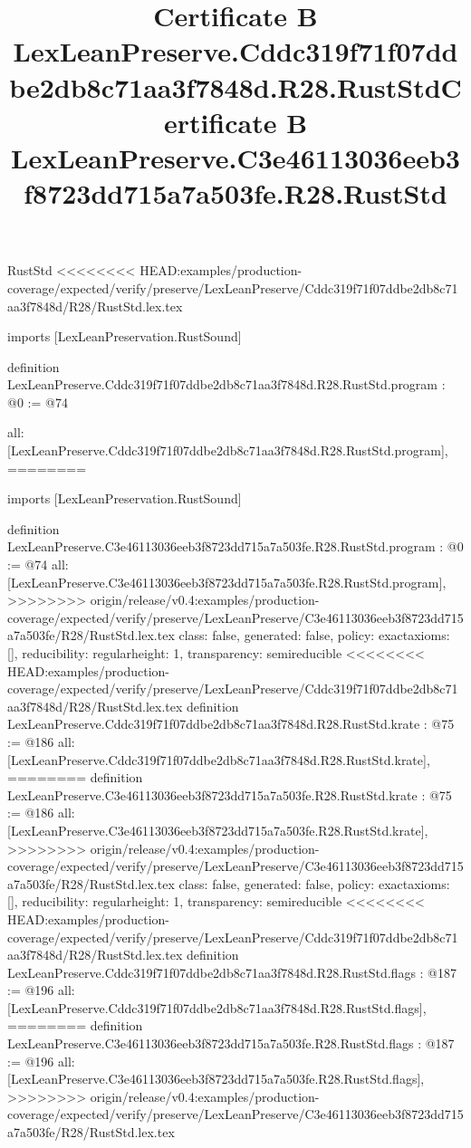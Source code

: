 \begin{lexlean}{RustStd}
<<<<<<<< HEAD:examples/production-coverage/expected/verify/preserve/LexLeanPreserve/Cddc319f71f07ddbe2db8c71aa3f7848d/R28/RustStd.lex.tex
\title{Certificate B LexLeanPreserve.Cddc319f71f07ddbe2db8c71aa3f7848d.R28.RustStd}
\begin{coremodule}
imports [LexLeanPreservation.RustSound]

definition LexLeanPreserve.Cddc319f71f07ddbe2db8c71aa3f7848d.R28.RustStd.program : @0 := @74 {
  all: [LexLeanPreserve.Cddc319f71f07ddbe2db8c71aa3f7848d.R28.RustStd.program],
========
\title{Certificate B LexLeanPreserve.C3e46113036eeb3f8723dd715a7a503fe.R28.RustStd}
\begin{coremodule}
imports [LexLeanPreservation.RustSound]

definition LexLeanPreserve.C3e46113036eeb3f8723dd715a7a503fe.R28.RustStd.program : @0 := @74 {
  all: [LexLeanPreserve.C3e46113036eeb3f8723dd715a7a503fe.R28.RustStd.program],
>>>>>>>> origin/release/v0.4:examples/production-coverage/expected/verify/preserve/LexLeanPreserve/C3e46113036eeb3f8723dd715a7a503fe/R28/RustStd.lex.tex
  class: false,
  generated: false,
  policy: exact{axioms: []},
  reducibility: regular{height: 1},
  transparency: semireducible
}
<<<<<<<< HEAD:examples/production-coverage/expected/verify/preserve/LexLeanPreserve/Cddc319f71f07ddbe2db8c71aa3f7848d/R28/RustStd.lex.tex
definition LexLeanPreserve.Cddc319f71f07ddbe2db8c71aa3f7848d.R28.RustStd.krate : @75 := @186 {
  all: [LexLeanPreserve.Cddc319f71f07ddbe2db8c71aa3f7848d.R28.RustStd.krate],
========
definition LexLeanPreserve.C3e46113036eeb3f8723dd715a7a503fe.R28.RustStd.krate : @75 := @186 {
  all: [LexLeanPreserve.C3e46113036eeb3f8723dd715a7a503fe.R28.RustStd.krate],
>>>>>>>> origin/release/v0.4:examples/production-coverage/expected/verify/preserve/LexLeanPreserve/C3e46113036eeb3f8723dd715a7a503fe/R28/RustStd.lex.tex
  class: false,
  generated: false,
  policy: exact{axioms: []},
  reducibility: regular{height: 1},
  transparency: semireducible
}
<<<<<<<< HEAD:examples/production-coverage/expected/verify/preserve/LexLeanPreserve/Cddc319f71f07ddbe2db8c71aa3f7848d/R28/RustStd.lex.tex
definition LexLeanPreserve.Cddc319f71f07ddbe2db8c71aa3f7848d.R28.RustStd.flags : @187 := @196 {
  all: [LexLeanPreserve.Cddc319f71f07ddbe2db8c71aa3f7848d.R28.RustStd.flags],
========
definition LexLeanPreserve.C3e46113036eeb3f8723dd715a7a503fe.R28.RustStd.flags : @187 := @196 {
  all: [LexLeanPreserve.C3e46113036eeb3f8723dd715a7a503fe.R28.RustStd.flags],
>>>>>>>> origin/release/v0.4:examples/production-coverage/expected/verify/preserve/LexLeanPreserve/C3e46113036eeb3f8723dd715a7a503fe/R28/RustStd.lex.tex
}}}
\end{coremodule}}
\end{coremodule}
\end{lexlean}

